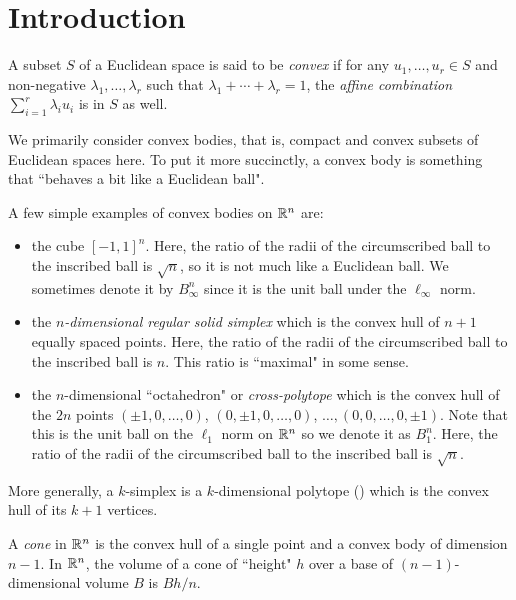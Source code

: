 
\section{Introduction}

\begin{fdef}
A subset $S$ of a Euclidean space is said to be \textit{convex} if for any $u_1,\ldots,u_r\in S$ and non-negative $\lambda_1,\ldots,\lambda_r$ such that $\lambda_1+\cdots+\lambda_r=1$, the \textit{affine combination} $\sum_{i=1}^r \lambda_i u_i$ is in $S$ as well.
\end{fdef}

We primarily consider convex bodies, that is, compact and convex subsets of Euclidean spaces here. To put it more succinctly, a convex body is something that ``behaves a bit like a Euclidean ball".

A few simple examples of convex bodies on $\mathbb{R}^n$ are:
\begin{itemize}
    \item the cube $[-1,1]^n$. Here, the ratio of the radii of the circumscribed ball to the inscribed ball is $\sqrt n$, so it is not much like a Euclidean ball. We sometimes denote it by $B_\infty^n$ since it is the unit ball under the $\ell_\infty$ norm.
    \item the \textit{$n$-dimensional regular solid simplex} which is the convex hull of $n+1$ equally spaced points. Here, the ratio of the radii of the circumscribed ball to the inscribed ball is $n$. This ratio is ``maximal" in some sense.
    \item the $n$-dimensional ``octahedron" or \textit{cross-polytope} which is the convex hull of the $2n$ points $(\pm 1, 0,\ldots, 0)$, $(0,\pm 1, 0,\ldots, 0)$, $\ldots, (0,0,\ldots,0,\pm 1)$. Note that this is the unit ball on the $\ell_1$ norm on $\mathbb{R}^n$ so we denote it as $B_1^n$. Here, the ratio of the radii of the circumscribed ball to the inscribed ball is $\sqrt n$.
\end{itemize}

More generally, a $k$-simplex is a $k$-dimensional polytope () which is the convex hull of its $k+1$ vertices. 

\begin{definition}
A \textit{cone} in $\mathbb{R}^n$ is the convex hull of a single point and a convex body of dimension $n-1$. In $\mathbb{R}^n$, the volume of a cone of ``height" $h$ over a base of $(n-1)$-dimensional volume $B$ is $Bh/n$.
\end{definition}

